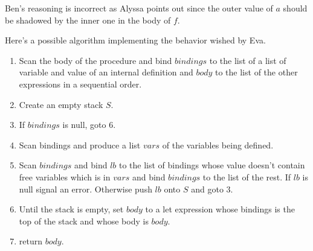 \documentclass[a4paper,12pt]{article}
\begin{document}
Ben's reasoning is incorrect as Alyssa points out since the outer
value of $a$ should be shadowed by the inner one in the body of $f$.

Here's a possible algorithm implementing the behavior wished by Eva.

\begin{enumerate}

\item Scan the body of the procedure and bind $bindings$ to the list
  of a list of variable and value of an internal definition and
  $body$ to the list of the other expressions in a sequential order.

\item Create an empty stack $S$.

\item If $bindings$ is null, goto $6$.

\item Scan bindings and produce a list $vars$ of the
  variables being defined.

\item Scan $bindings$ and bind $lb$ to the list of bindings whose
  value doesn't contain free variables which is in $vars$ and bind
  $bindings$ to the list of the rest.  If $lb$ is null signal an
  error.  Otherwise push $lb$ onto $S$ and goto $3$.

\item Until the stack is empty, set $body$ to a let expression whose
  bindings is the top of the stack and whose body is $body$.

\item return $body$.

\end{enumerate}
\end{document}
